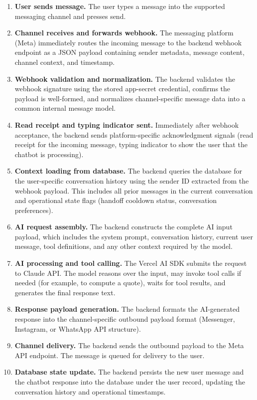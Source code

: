 \begin{enumerate}
    \item \textbf{User sends message.} The user types a message into the supported messaging channel and presses send.
    \item \textbf{Channel receives and forwards webhook.} The messaging platform (Meta) immediately routes the incoming message to the backend webhook endpoint as a JSON payload containing sender metadata, message content, channel context, and timestamp.
    \item \textbf{Webhook validation and normalization.} The backend validates the webhook signature using the stored app-secret credential, confirms the payload is well-formed, and normalizes channel-specific message data into a common internal message model.
    \item \textbf{Read receipt and typing indicator sent.} Immediately after webhook acceptance, the backend sends platform-specific acknowledgment signals (read receipt for the incoming message, typing indicator to show the user that the chatbot is processing).
    \item \textbf{Context loading from database.} The backend queries the database for the user-specific conversation history using the sender ID extracted from the webhook payload. This includes all prior messages in the current conversation and operational state flags (handoff cooldown status, conversation preferences).
    \item \textbf{AI request assembly.} The backend constructs the complete AI input payload, which includes the system prompt, conversation history, current user message, tool definitions, and any other context required by the model.
    \item \textbf{AI processing and tool calling.} The Vercel AI SDK submits the request to Claude API. The model reasons over the input, may invoke tool calls if needed (for example, to compute a quote), waits for tool results, and generates the final response text.
    \item \textbf{Response payload generation.} The backend formats the AI-generated response into the channel-specific outbound payload format (Messenger, Instagram, or WhatsApp API structure).
    \item \textbf{Channel delivery.} The backend sends the outbound payload to the Meta API endpoint. The message is queued for delivery to the user.
    \item \textbf{Database state update.} The backend persists the new user message and the chatbot response into the database under the user record, updating the conversation history and operational timestamps.
\end{enumerate}

